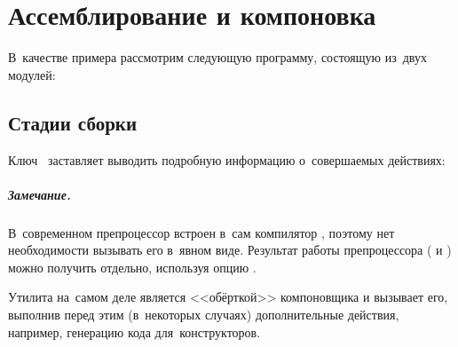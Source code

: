 
\chapter{Ассемблирование и компоновка}
В~качестве примера рассмотрим следующую программу, состоящую из~двух модулей:

\medskip\noindent
\begin{minipage}[t]{0.5\textwidth}
  \begin{flushleft}
    \underline{}
  \end{flushleft}
\end{minipage}%
%
\begin{minipage}[t]{0.5\textwidth}
  \begin{flushleft}
    \underline{}
  \end{flushleft}
\end{minipage}



\section{Стадии сборки}
Ключ~ заставляет \GCC{} выводить подробную информацию о~совершаемых действиях:



\paragraph{Замечание.}
В~современном \GCC{} препроцессор встроен в~сам компилятор , поэтому нет необходимости вызывать его в~явном виде. Результат работы препроцессора ( и ) можно получить отдельно, используя опцию .

Утилита  на~самом деле является <<обёрткой>> компоновщика  и вызывает его, выполнив перед этим (в~некоторых случаях) дополнительные действия, например, генерацию кода для~конструкторов.



